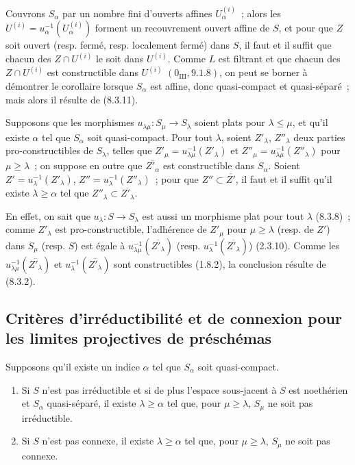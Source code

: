 Couvrons $S_\alpha$ par un nombre fini d'ouverts affines
$U_\alpha^{(i)}$~; alors les $U^{(i)}=u_\alpha^{-1}(U_\alpha^{(i)})$ forment
un recouvrement ouvert affine de $S$, et pour que $Z$ soit ouvert (resp.
fermé, resp. localement fermé) dans $S$, il faut et il suffit que chacun des
$Z\cap U^{(i)}$ le soit dans $U^{(i)}$. Comme $L$ est filtrant et que chacun
des $Z\cap U^{(i)}$ est constructible dans $U^{(i)}$
$(0_{\mathrm{III}},9.1.8)$, on peut se borner à démontrer le corollaire
lorsque $S_\alpha$ est affine, donc quasi-compact et quasi-séparé~; mais alors
il résulte de (8.3.11).

\begin{proposition}[8.3.13]
\label{IV.8.3.13-fr}
Supposons que les morphismes $u_{\lambda\mu}:S_\mu\to S_\lambda$ soient
plats pour $\lambda\leq\mu$, et qu'il existe $\alpha$ tel que $S_\alpha$ soit
quasi-compact. Pour tout $\lambda$, soient $Z'_\lambda$, $Z''_\lambda$ deux
parties pro-constructibles de $S_\lambda$, telles que
$Z'_\mu=u_{\lambda\mu}^{-1}(Z'_\lambda)$ et
$Z''_\mu=u_{\lambda\mu}^{-1}(Z''_\lambda)$ pour $\mu\geq\lambda$~; on
suppose en outre que $\overline{Z'_\alpha}$ est constructible dans
$S_\alpha$. Soient $Z'=u_\lambda^{-1}(Z'_\lambda)$,
$Z''=u_\lambda^{-1}(Z''_\lambda)$~; pour que
$Z''\subset\overline{Z'}$, il faut et il suffit qu'il existe
$\lambda\geq\alpha$ tel que
$Z''_\lambda\subset\overline{Z'_\lambda}$.
\end{proposition}

En effet, on sait que $u_\lambda:S\to S_\lambda$ est aussi un morphisme plat
pour tout $\lambda$ (8.3.8)~; comme $Z'_\lambda$ est pro-constructible,
l'adhérence de $Z'_\mu$ pour $\mu\geq\lambda$ (resp. de $Z'$) dans $S_\mu$
(resp. $S$) est égale à
$u_{\lambda\mu}^{-1}(\overline{Z'_\lambda})$ (resp.
$u_\lambda^{-1}(\overline{Z'_\lambda})$) (2.3.10). Comme les
$u_{\lambda\mu}^{-1}(\overline{Z'_\lambda})$ et
$u_\lambda^{-1}(\overline{Z'_\lambda})$ sont constructibles (1.8.2), la
conclusion résulte de (8.3.2).

\subsection{Critères d'irréductibilité et de connexion pour les limites
projectives de préschémas}
\label{subsection:IV.8.4-fr}

\begin{proposition}[8.4.1]
\label{IV.8.4.1-fr}
Supposons qu'il existe un indice $\alpha$ tel que $S_\alpha$ soit
quasi-compact.
\begin{enumerate}
\item[(i)] Si $S$ n'est pas irréductible et si de plus l'espace sous-jacent à
$S$ est noethérien et $S_\alpha$ quasi-séparé, il existe
$\lambda\geq\alpha$ tel que, pour $\mu\geq\lambda$, $S_\mu$ ne soit pas
irréductible.
\item[(ii)] Si $S$ n'est pas connexe, il existe $\lambda\geq\alpha$ tel que,
pour $\mu\geq\lambda$, $S_\mu$ ne soit pas connexe.
\end{enumerate}
\end{proposition}

